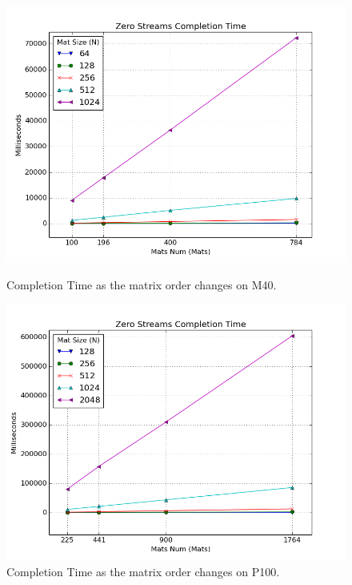 \begin{figure}
	\centering
	\vspace{-2cm}
	\includegraphics[scale=0.7]{plots/mat_comp_sizevar.png}
	\caption{Completion Time as the matrix order changes on M40.}
	
	\includegraphics[scale=0.7]{plots/mat_comp_sizevar_P100.png}
	\caption{Completion Time as the matrix order changes on P100.}
	\label{fig:matcompsize}
\end{figure} 

